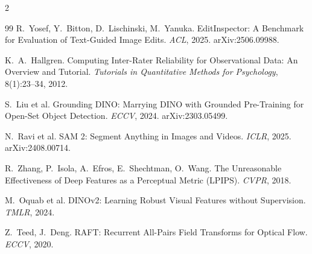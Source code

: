 \documentclass[10pt,a4paper]{article}
\begin{document}
\begin{multicols}{2}
\begin{thebibliography}{99}
 R.~Yosef, Y.~Bitton, D.~Lischinski, M.~Yanuka. EditInspector: A Benchmark for Evaluation of Text-Guided Image Edits. \emph{ACL}, 2025. arXiv:2506.09988.

 K.~A.~Hallgren. Computing Inter-Rater Reliability for Observational Data: An Overview and Tutorial. \emph{Tutorials in Quantitative Methods for Psychology}, 8(1):23--34, 2012.

 S.~Liu et al. Grounding DINO: Marrying DINO with Grounded Pre-Training for Open-Set Object Detection. \emph{ECCV}, 2024. arXiv:2303.05499.

 N.~Ravi et al. SAM 2: Segment Anything in Images and Videos. \emph{ICLR}, 2025. arXiv:2408.00714.

 R.~Zhang, P.~Isola, A.~Efros, E.~Shechtman, O.~Wang. The Unreasonable Effectiveness of Deep Features as a Perceptual Metric (LPIPS). \emph{CVPR}, 2018.

 M.~Oquab et al. DINOv2: Learning Robust Visual Features without Supervision. \emph{TMLR}, 2024.

 Z.~Teed, J.~Deng. RAFT: Recurrent All-Pairs Field Transforms for Optical Flow. \emph{ECCV}, 2020.

\end{thebibliography}
\end{multicols}
\end{document}
